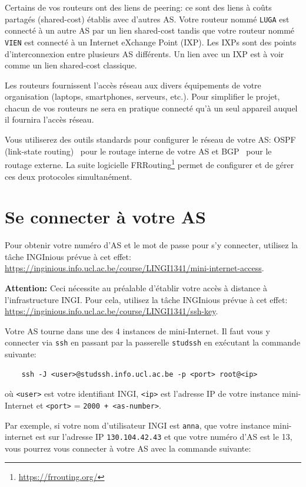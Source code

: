 \documentclass[a4paper, 11pt]{article}
\newcommand{\warning}[1]{\begin{hintBox} \textbf{Attention:} #1 \end{hintBox}}
\newcommand{\info}[1]{\begin{infoBox}  #1 \end{infoBox}}
\begin{document}
Certains de vos routeurs ont des liens de peering: ce sont
des liens à coûts partagés (shared-cost) établis avec d'autres AS.
Votre routeur nommé \texttt{LUGA} est connecté à un autre AS par un
lien shared-cost tandis que votre routeur nommé \texttt{VIEN} est
connecté à un Internet eXchange Point (IXP). Les IXPs sont des points
d'interconnexion entre plusieurs AS différents. Un lien avec un IXP
est à voir comme un lien shared-cost classique.

Les routeurs fournissent l'accès réseau aux divers équipements de votre
organisation (laptops, smartphones, serveurs, etc.). Pour simplifier
le projet, chacun de vos routeurs ne sera en pratique connecté qu'à un
seul appareil auquel il fournira l'accès réseau.

Vous utiliserez des outils standards pour configurer le réseau de votre
AS: OSPF (link-state routing)~\cite{rfc2328} pour le routage interne de votre AS et
BGP~\cite{rfc4271} pour le routage externe. La suite logicielle
FRRouting\footnote{\url{https://frrouting.org/}} permet de configurer
et de gérer ces deux protocoles simultanément.


\section{Se connecter à votre AS}

\info{Pour obtenir votre numéro d'AS et le mot de passe pour s'y connecter,
utilisez la tâche INGInious prévue à cet effet:
\url{https://inginious.info.ucl.ac.be/course/LINGI1341/mini-internet-access}.}

\warning{Ceci nécessite au préalable d'établir votre accès à distance à
l'infrastructure INGI. Pour cela, utilisez la tâche INGInious prévue à cet effet:
\url{https://inginious.info.ucl.ac.be/course/LINGI1341/ssh-key}.}

Votre AS tourne dans une des 4 instances de mini-Internet. Il
faut vous y connecter via \texttt{ssh} en passant par la passerelle
\texttt{studssh} en exécutant la commande suivante:
\begin{verbatim}
    ssh -J <user>@studssh.info.ucl.ac.be -p <port> root@<ip>
\end{verbatim}
où \texttt{<user>} est votre identifiant INGI, \texttt{<ip>} est
l'adresse IP de votre instance mini-Internet et \texttt{<port>}
= \texttt{2000 + <as-number>}.

Par exemple, si votre nom d'utilisateur INGI est \texttt{anna},
que votre instance mini-internet est sur l'adresse IP
\texttt{130.104.42.43} et que votre numéro d'AS est le 13,
vous pourrez vous connecter à votre AS avec la commande suivante:
\end{document}
